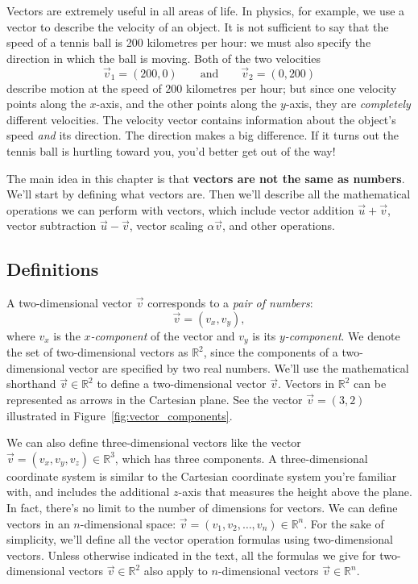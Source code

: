 	Vectors are extremely useful in all areas of life.
	In physics, for example, we use a vector to describe the velocity of an object.
	It is not sufficient to say that the speed of a tennis ball is 200 kilometres per hour:
	we must also specify the direction in which the ball is moving.
	Both of the two velocities 
	\[
	 \vec{v}_1 = (200,0) 
	 \qquad \textrm{and}
	 \qquad \vec{v}_2=(0,200)
	\]
	describe motion at the speed of $200$ kilometres per hour;
	but since one velocity points along the $x$-axis, and the other points along the $y$-axis,
	they are \emph{completely} different velocities. 
	The velocity vector contains information about the object's speed \emph{and} its direction.
	The direction makes a big difference.
	If it turns out the tennis ball is hurtling toward you, you'd better get out of the way!

	The main idea in this chapter is that \textbf{vectors are not the same as numbers}.
	We'll start by defining what vectors are.
	Then we'll describe all the mathematical operations we can perform with vectors,
	which include
		vector addition $\vec{u}+\vec{v}$, 
		vector subtraction $\vec{u}-\vec{v}$,
		vector scaling $\alpha\vec{v}$,
		and other operations.


	\subsection{Definitions}
	\label{vectors:definitions}

		A two-dimensional vector $\vec{v}$ corresponds to a \emph{pair of numbers}:
		\[
			\vec{v} = (v_x, v_y),
		\]
		where $v_x$ is the \emph{$x$-component} of the vector and $v_y$ is its \emph{$y$-component}.					
		We denote the set of two-dimensional vectors as $\mathbb{R}^2$,
		since the components of a two-dimensional vector are specified by two real numbers.
		We'll use the mathematical shorthand $\vec{v} \in \mathbb{R}^2$ to define a two-dimensional vector $\vec{v}$.
		Vectors in $\mathbb{R}^2$ can be represented as arrows in the Cartesian plane.
		See the vector $\vec{v}=(3,2)$ illustrated in Figure~\ref{fig:vector_components}.

		We can also define three-dimensional vectors like the vector $\vec{v} = (v_x, v_y, v_z) \in \mathbb{R}^3$,
		which has three components.
		A three-dimensional coordinate system is similar to the Cartesian coordinate system you're familiar with,
		and includes the additional $z$-axis that measures the height above the plane.
		In fact,
		there's no limit to the number of dimensions for vectors.
		We can define vectors in an $n$-dimensional space:								
		$\vec{v} = (v_1, v_2, \ldots, v_n) \in \mathbb{R}^n$.
		For the sake of simplicity,
		we'll define all the vector operation formulas using two-dimensional vectors.
		Unless otherwise indicated in the text,
		all the formulas we give for two-dimensional vectors $\vec{v} \in \mathbb{R}^2$
		also apply to $n$-dimensional vectors $\vec{v} \in \mathbb{R}^n$.


